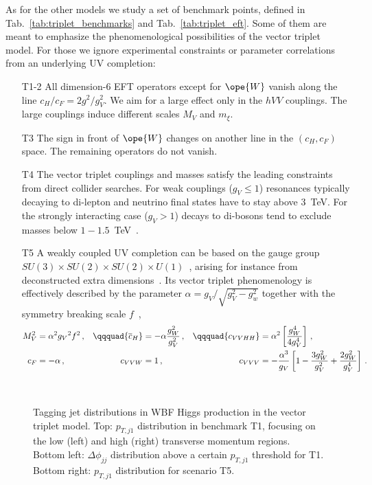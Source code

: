 As for the other models we study a set of benchmark points, defined in
Tab.~\ref{tab:triplet_benchmarks} and Tab.~\ref{tab:triplet_eft}.
Some of them are meant to emphasize the phenomenological possibilities
of the vector triplet model. For those we ignore experimental
constraints or parameter correlations from an underlying UV
completion:
%
\begin{itemize}
\item[T1-2] All dimension-6 EFT operators except for $\ope{W}$ vanish
along the line $c_H/c_F = 2 g^2/g_V^2$.  We aim for a large effect
only in the $hVV$ couplings.  The large couplings induce different
scales $M_V$ and $m_\xi$.
\item[T3] The sign in front of $\ope{W}$ changes on another line in
the $(c_H, c_F)$ space. The remaining operators do not vanish.
\item[T4] The vector triplet couplings and masses satisfy the leading
constraints from direct collider searches. For weak couplings (${g_V}
\leq 1$) resonances typically decaying to di-lepton and neutrino final
states have to stay above 3~TeV.  For the strongly interacting case
(${g_V} >1$) decays to di-bosons tend to exclude masses below
$1-1.5$~TeV~\cite{Pappadopulo:2014qza,Kaminska:2015ora}.
 \item[T5] A weakly coupled UV completion can be based on the gauge
group $SU(3) \times SU(2) \times SU(2) \times
U(1)$~\cite{Barger:1980ti}, arising for instance from deconstructed
extra dimensions~\cite{ArkaniHamed:2001nc}. Its vector triplet
phenomenology is effectively described by the parameter $\alpha = g_V
/ \sqrt{g_V^2 - g_w^2}$ together with the symmetry breaking scale
$f$~\cite{Pappadopulo:2014qza},
%
 \begin{alignat}{3} M_V^2 &= \alpha^2 {g_V}^2 f^2 \,, & \qqquad
{\overline{c}_{H}} &= - \alpha \dfrac {g_W^2}{g_V^2} \,, & \qqquad
{c_{VVHH}} &= \alpha^2 \left[ \dfrac {g_W^4} {4g_V^4} \right] \,,
\notag \\ {c_F} &= - \alpha \,, & \qquad {c_{VVW}} &= 1 \,, & \qquad
{c_{VVV}} &= - \dfrac{\alpha^3}{g_V} \left[1 - \dfrac{3g_W^2}{g_V^2} +
\dfrac {2g_W^2} {g_V^4} \right] \,.
 \end{alignat}
\end{itemize} \medskip

\begin{figure}[t] \centering
   \\
  \caption{Tagging jet distributions in WBF Higgs production in the
vector triplet model.  Top: $p_{T,j1}$ distribution in benchmark T1,
focusing on the low (left) and high (right) transverse momentum
regions.  Bottom left: $\Delta \phi_{jj}$ distribution above a certain
$p_{T,j1}$ threshold for T1.  Bottom right: $p_{T,j1}$ distribution
for scenario T5.}
  \label{fig:validity_triplet_wbf}
\end{figure}

